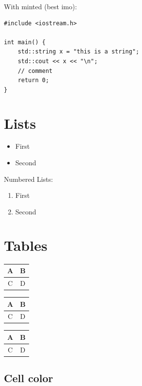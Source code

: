 \documentclass{article}
\begin{document}
With minted (best imo):

\begin{tcolorbox}[colback=gray!5, colframe=gray!30, arc=4pt]
\begin{verbatim}
#include <iostream.h>

int main() {
    std::string x = "this is a string";
    std::cout << x << "\n";
    // comment
    return 0;
}
\end{verbatim}
\end{tcolorbox}

\section{Lists}

\begin{itemize}
    \item First
    \item Second
\end{itemize}

Numbered Lists:

\begin{enumerate}
    \item First
    \item Second
\end{enumerate}

\section{Tables}

\begin{tabular}{|c|c|}
\hline
    A & B \\
\hline
    C & D \\
\hline
\end{tabular}

\begin{tabular}{c|c|}
\hline
    A & B \\
\hline
    C & D \\
\hline
\end{tabular}

\begin{tabular}{c|c}
\hline
    A & B \\
\hline
    C & D \\
\hline
\end{tabular}


\subsection{Cell color}
\end{document}
